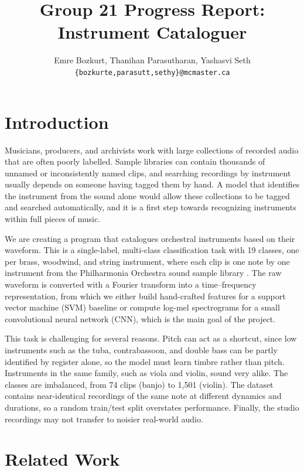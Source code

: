 \documentclass[11pt]{article}
\title{Group 21 Progress Report:\\Instrument Cataloguer}
\author{Emre Bozkurt, Thanihan Parasutharan, Yashasvi Seth \\
  \texttt{\{bozkurte,parasutt,sethy\}@mcmaster.ca} }
\begin{document}
\maketitle

\section{Introduction}

Musicians, producers, and archivists work with large collections of recorded audio that are often poorly labelled. Sample libraries can contain thousands of unnamed or inconsistently named clips, and searching recordings by instrument usually depends on someone having tagged them by hand. A model that identifies the instrument from the sound alone would allow these collections to be tagged and searched automatically, and it is a first step towards recognizing instruments within full pieces of music.

We are creating a program that catalogues orchestral instruments based on their waveform. This is a single-label, multi-class classification task with 19 classes, one per brass, woodwind, and string instrument, where each clip is one note by one instrument from the Philharmonia Orchestra sound sample library \citep{philharmonia_samples}. The raw waveform is converted with a Fourier transform into a time--frequency representation, from which we either build hand-crafted features for a support vector machine (SVM) baseline or compute log-mel spectrograms for a small convolutional neural network (CNN), which is the main goal of the project.

This task is challenging for several reasons. Pitch can act as a shortcut, since low instruments such as the tuba, contrabassoon, and double bass can be partly identified by register alone, so the model must learn timbre rather than pitch. Instruments in the same family, such as viola and violin, sound very alike. The classes are imbalanced, from 74 clips (banjo) to 1,501 (violin). The dataset contains near-identical recordings of the same note at different dynamics and durations, so a random train/test split overstates performance. Finally, the studio recordings may not transfer to noisier real-world audio.

\section{Related Work}
\end{document}
